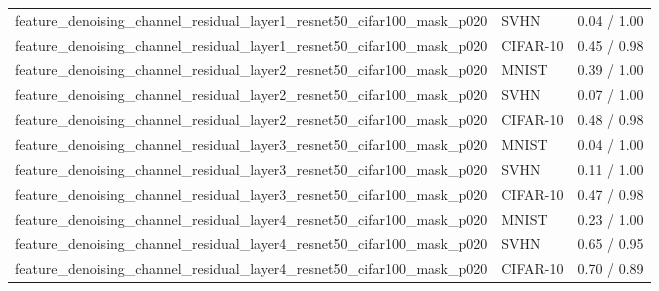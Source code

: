 \begin{tabular}{lll}
feature\_denoising\_channel\_residual\_layer1\_resnet50\_cifar100\_mask\_p020 & SVHN & 0.04 / 1.00 \\
feature\_denoising\_channel\_residual\_layer1\_resnet50\_cifar100\_mask\_p020 & CIFAR-10 & 0.45 / 0.98 \\
feature\_denoising\_channel\_residual\_layer2\_resnet50\_cifar100\_mask\_p020 & MNIST & 0.39 / 1.00 \\
feature\_denoising\_channel\_residual\_layer2\_resnet50\_cifar100\_mask\_p020 & SVHN & 0.07 / 1.00 \\
feature\_denoising\_channel\_residual\_layer2\_resnet50\_cifar100\_mask\_p020 & CIFAR-10 & 0.48 / 0.98 \\
feature\_denoising\_channel\_residual\_layer3\_resnet50\_cifar100\_mask\_p020 & MNIST & 0.04 / 1.00 \\
feature\_denoising\_channel\_residual\_layer3\_resnet50\_cifar100\_mask\_p020 & SVHN & 0.11 / 1.00 \\
feature\_denoising\_channel\_residual\_layer3\_resnet50\_cifar100\_mask\_p020 & CIFAR-10 & 0.47 / 0.98 \\
feature\_denoising\_channel\_residual\_layer4\_resnet50\_cifar100\_mask\_p020 & MNIST & 0.23 / 1.00 \\
feature\_denoising\_channel\_residual\_layer4\_resnet50\_cifar100\_mask\_p020 & SVHN & 0.65 / 0.95 \\
feature\_denoising\_channel\_residual\_layer4\_resnet50\_cifar100\_mask\_p020 & CIFAR-10 & 0.70 / 0.89 \\
\bottomrule
\end{tabular}
